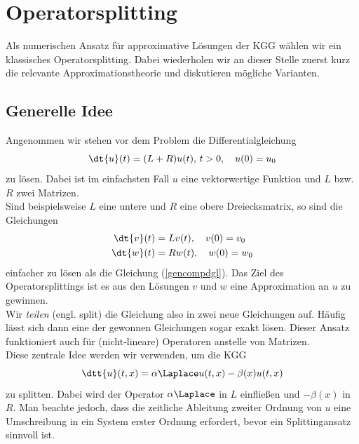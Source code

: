 \section{Operatorsplitting}
Als numerischen Ansatz für approximative Lösungen der KGG wählen wir ein klassisches Operatorsplitting. Dabei wiederholen wir an dieser Stelle zuerst kurz die relevante Approximationstheorie und diskutieren mögliche Varianten.
\subsection{Generelle Idee}
Angenommen wir stehen vor dem Problem die Differentialgleichung 
\begin{equation}
\label{gencompdgl}
\dt{u}(t)=(L+R)u(t), \, t>0, \quad u(0)=u_0
\end{equation}
zu lösen. Dabei ist im einfachsten Fall $u$ eine vektorwertige Funktion und $L$ bzw. $R$ zwei Matrizen.\\
Sind beispielsweise $L$ eine untere und $R$ eine obere Dreiecksmatrix, so sind die Gleichungen 
\begin{align*}
\dt{v}(t)&=Lv(t), \quad v(0)=v_0\\
\dt{w}(t)&=Rw(t), \quad w(0)=w_0
\end{align*}
einfacher zu lösen als die Gleichung (\ref{gencompdgl}). Das Ziel des Operatorsplittings ist es aus den Lösungen $v$ und $w$ eine Approximation an $u$ zu gewinnen.\\
Wir \emph{teilen} (engl. split) die Gleichung also in zwei neue Gleichungen auf. Häufig lässt sich dann eine der gewonnen Gleichungen sogar exakt lösen. Dieser Ansatz funktioniert auch für (nicht-lineare) Operatoren anstelle von Matrizen.\\
Diese zentrale Idee werden wir verwenden, um die KGG 
\begin{equation*}
\dtt{u}(t,x)=\alpha\Laplace u(t,x)-\beta(x)u(t,x)
\end{equation*}
zu splitten. Dabei wird der Operator $\alpha\Laplace$ in $L$ einfließen und $-\beta(x)$ in $R$. Man beachte jedoch, dass die zeitliche Ableitung zweiter Ordnung von $u$ eine Umschreibung in ein System erster Ordnung erfordert, bevor ein Splittingansatz sinnvoll ist.

